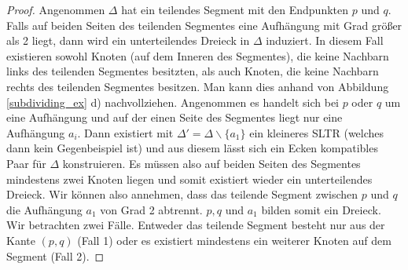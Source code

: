 \begin{proof}
Angenommen $\Delta$ hat ein teilendes Segment mit den Endpunkten $p$ und $q$. Falls auf beiden Seiten des teilenden Segmentes eine Aufhängung mit Grad größer als 2 liegt, dann wird ein unterteilendes Dreieck in $\Delta$ induziert. In diesem Fall existieren sowohl Knoten (auf dem Inneren des Segmentes), die keine Nachbarn links des teilenden Segmentes besitzten, als auch Knoten, die keine Nachbarn rechts des teilenden Segmentes besitzen. Man kann dies anhand von Abbildung \ref{subdividing_ex} d) nachvollziehen. Angenommen es handelt sich bei $p$ oder $q$ um eine Aufhängung und auf der einen Seite des Segmentes liegt nur eine Aufhängung $a_i$. Dann existiert mit $\Delta' = \Delta \backslash \{a_1\}$ ein kleineres SLTR (welches dann kein Gegenbeispiel ist) und aus diesem lässt sich ein Ecken kompatibles Paar für $\Delta$ konstruieren. Es müssen also auf beiden Seiten des Segmentes mindestens zwei Knoten liegen und somit existiert wieder ein unterteilendes Dreieck. Wir können also annehmen, dass das teilende Segment zwischen $p$ und $q$ die Aufhängung $a_1$ von Grad 2 abtrennt. $p,q$ und $a_1$ bilden somit ein Dreieck. Wir betrachten zwei Fälle. Entweder das teilende Segment besteht nur aus der Kante $(p,q)$ (Fall 1) oder es existiert mindestens ein weiterer Knoten auf dem Segment (Fall 2).


\end{proof}
